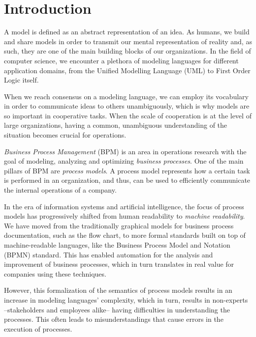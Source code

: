 \chapter{Introduction}
\label{cha:intro}

A model is defined as an abstract representation of an idea. As humans, we build
and share models in order to transmit our mental representation of reality and,
as such, they are one of the main building blocks of our organizations. In the field of
computer science, we encounter a plethora of modeling languages for different
application domains, from the Unified Modelling Language (UML) to First Order
Logic itself.

When we reach consensus on a modeling language, we can employ its vocabulary in
order to communicate ideas to others unambiguously, which is why models are so
important in cooperative tasks. When the scale of cooperation is at the level of
large organizations, having a common, unambiguous understanding of the situation
becomes crucial for operations.

\textit{Business Process Management} (BPM) is an area in operations research
with the goal of modeling, analyzing and optimizing \textit{business processes}.
One of the main pillars of BPM are \emph{process models}. A process model 
represents how a certain task is performed in an organization, and thus, can be
used to efficiently communicate the internal operations of a company.

In the era of information systems and artificial intelligence, the
focus of process models has progressively shifted from human readability to
\textit{machine readability}. We have moved from the traditionally graphical
models for business process documentation, such as the flow chart, to more
formal standards built on top of machine-readable languages, like the Business
Process Model and Notation (BPMN) \cite{chinosi2012bpmn} standard. This has
enabled automation for the analysis and improvement of business processes, which
in turn translates in real value for companies using these techniques.

However, this formalization of the semantics of process models results in an
increase in modeling languages' complexity, which in turn, results in
non-experts --stakeholders and employees alike-- having difficulties in
understanding the processes\cite{citation needed}. This often leads to
misunderstandings that cause errors in the execution of processes.


